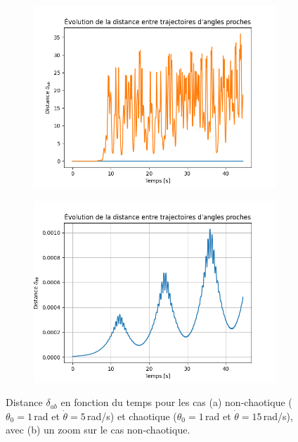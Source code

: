 \documentclass[a4paper,12pt,twoside]{article}
\begin{document}
\begin{figure}[H]
\begin{subfigure}{0.5\textwidth}  %
    \centering  %
    \includegraphics[scale=0.5]{graphes/question_4.png}
    \caption{}
    \label{fig7a}
\end{subfigure}
\hspace{0.01\textwidth}
\begin{subfigure}{0.5\textwidth}  %
    \centering  %
    \includegraphics[scale=0.5]{graphes/question_4_zoom.png}
    \caption{}
    \label{fig7b}
\end{subfigure}
\captionsetup{justification=centering}
\caption{Distance $\delta _{ab}$ en fonction du temps pour les cas (a) non-chaotique ($\theta_0=1$\,rad et $\dot{\theta}=5$\,rad/s) et chaotique ($\theta_0=1$\,rad et $\dot{\theta}=15$\,rad/s), avec (b) un zoom sur le cas non-chaotique.}

\label{fig7}
\end{figure}
\end{document}
